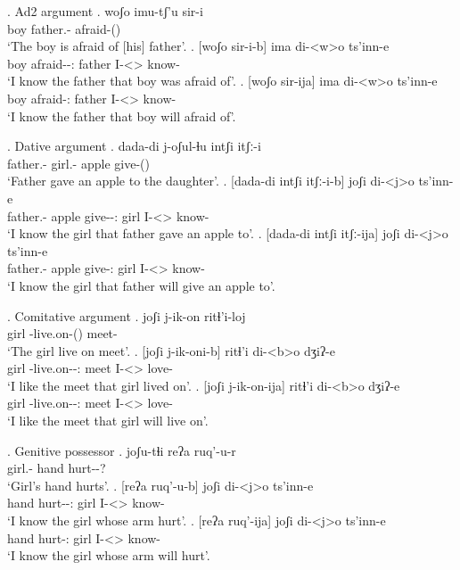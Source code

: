 \ex. Ad2 argument
	\ag. woʃo imu-tʃ'u sir-i\\
			{boy} {father.\Obl-\Ads} {afraid-\Pst(\Aor)}\\
			\glt `The boy is afraid of [his] father'.
	\bg. [woʃo sir-i-b] ima di-<w>o ts'inn-e\\
			{boy} {afraid-\Pst-\Ptcp:\Pst} father {I-<\M>\Aff} {know-\Hab} \\
			\glt `I know the father that boy was afraid of'.
	\bg. [woʃo sir-ija] ima di-<w>o ts'inn-e\\
			{boy} {afraid-\Ptcp:\Prae} father {I-<\M>\Aff} {know-\Hab} \\
			\glt `I know the father that boy will afraid of'.

\ex. Dative argument
	\ag. dada-di j-oʃul-ɬu intʃi itʃː-i\\
			{father.\Obl-\Erg} {girl.\Obl-\Dat} apple {give-\Pst(\Aor)}\\
			\glt `Father gave an apple to the daughter'.
	\bg. [dada-di intʃi itʃː-i-b] joʃi di-<j>o ts'inn-e\\
			{father.\Obl-\Erg} apple {give-\Pst-\Ptcp:\Pst} {girl} {I-<\F>\Aff} {know-\Hab} \\
			\glt `I know the girl that father gave an apple to'.
	\bg. [dada-di intʃi itʃː-ija] joʃi di-<j>o ts'inn-e\\
			{father.\Obl-\Erg} apple {give-\Ptcp:\Prae} {girl} {I-<\F>\Aff} {know-\Hab} \\
			\glt `I know the girl that father will give an apple to'.

\ex. Comitative argument
	\ag. joʃi j-ik-on ritɬ'i-loj\\
			girl {\F-live.on-\Pst(\Aor)} {meet-\Com}\\
			\glt `The girl live on meet'.
	\bg. [joʃi j-ik-oni-b] ritɬ'i di-<b>o dʒiʔ-e\\
			girl {\F-live.on-\Pst-\Ptcp:\Pst} meet {I-<\Nanf>\Aff} {love-\Hab}\\
			\glt `I like the meet that girl lived on'.
	\bg. [joʃi j-ik-on-ija] ritɬ'i di-<b>o dʒiʔ-e\\
			girl {\F-live.on-\Npst-\Ptcp:\Prae} meet {I-<\Nanf>\Aff} {love-\Hab}\\
			\glt `I like the meet that girl will live on'.

\ex. Genitive possessor
	\ag. joʃu-tɬi reʔa ruq'-u-r\\
			{girl.\Obl-\Gen} hand {hurt-\Pst-?}\\
			\glt `Girl's hand hurts'.
	\bg. [reʔa ruq'-u-b] joʃi di-<j>o ts'inn-e\\
			hand {hurt-\Pst-\Ptcp:\Pst} girl {I-<\F>\Aff} {know-\Hab}\\
			\glt `I know the girl whose arm hurt'.
	\bg. [reʔa ruq'-ija] joʃi di-<j>o ts'inn-e\\
			hand {hurt-\Ptcp:\Prae} girl {I-<\F>\Aff} {know-\Hab}\\
			\glt `I know the girl whose arm will hurt'.
			
